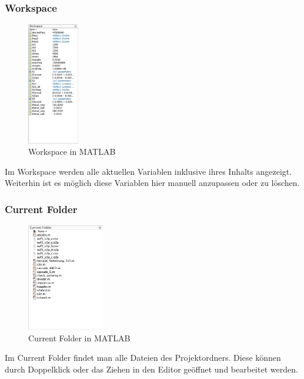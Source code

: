 \documentclass[12pt, a4paper, twoside]{article}
\begin{document}
            \subsubsection*{Workspace}
                \begin{figure}[H]
                    \centering
                    \includegraphics[width=0.2\textwidth]{Bilder/Workspace.png}
                    \caption{Workspace in MATLAB}
                \end{figure}
                Im Workspace werden alle aktuellen Variablen inklusive ihres Inhalts angezeigt. Weiterhin ist es möglich diese Variablen hier manuell anzupassen oder zu löschen.
            \subsubsection*{Current Folder}
                \begin{figure}[H]
                    \centering
                    \includegraphics[width=0.3\textwidth]{Bilder/CurrentFolder.png}      
                    \caption{Current Folder in MATLAB}              
                \end{figure}
                Im Current Folder findet man alle Dateien des Projektordners. Diese können durch Doppelklick oder das Ziehen in den Editor geöffnet und bearbeitet werden.
            \newpage
            
\end{document}
